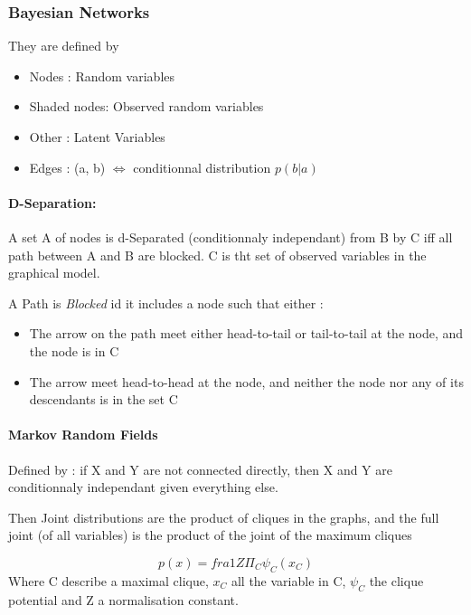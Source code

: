 		\subsubsection{Bayesian Networks}


			They are defined by 
			\begin{itemize}
				\item Nodes : Random variables
				\item Shaded nodes: Observed random variables
				\item Other : Latent Variables
				\item Edges : (a, b) $\iff$ conditionnal distribution $p(b|a)$
			\end{itemize}


			\paragraph*{D-Separation:} A set A of nodes is d-Separated (conditionnaly independant) from B by C iff all path between A and B are blocked. C is tht set of observed variables in the graphical model.
			\begin{definition}
				A Path is \emph{Blocked} id it includes a node such that either :
				\begin{itemize}
					\item The arrow on the path meet either head-to-tail or tail-to-tail at the node, and the node is in C 
					\item The arrow meet head-to-head at the node, and neither the node nor any of its descendants is in the set C
				\end{itemize}
			\end{definition}

			\paragraph*{Markov Random Fields}
				Defined by : if X and Y are not connected directly, then X and Y are conditionnaly independant given everything else.

				Then Joint distributions are the product of cliques in the graphs, and the full joint (of all variables) is the product of the joint of the maximum cliques

				\[
					p(x) = fra{1}{Z} \Pi _C \psi _C(x_C)
				\]
				Where C describe a maximal clique, $x_C$ all the variable in C, $\psi_C$ the clique potential and Z a normalisation constant. 

